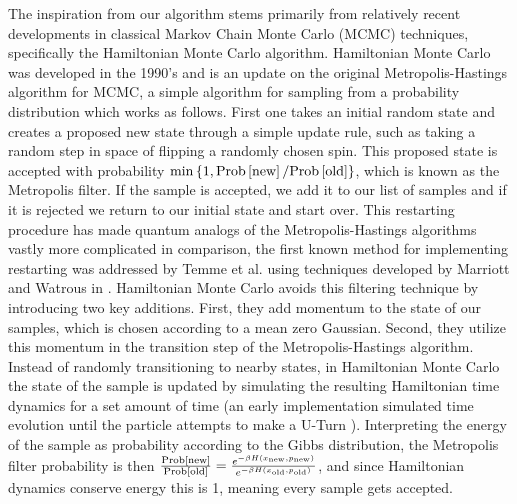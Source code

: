 \documentclass{article}
\newcommand{\set}[1]{\left\{ #1 \right\}}
\newcommand{\prob}[1]{{\rm Prob}\left[ #1 \right]}
\begin{document}
The inspiration from our algorithm stems primarily from relatively recent developments in classical Markov Chain Monte Carlo (MCMC) techniques, specifically the Hamiltonian Monte Carlo algorithm. Hamiltonian Monte Carlo was developed in the 1990's and is an update on the original Metropolis-Hastings algorithm for MCMC, a simple algorithm for sampling from a probability distribution which works as follows. First one takes an initial random state and creates a proposed new state through a simple update rule, such as taking a random step in space of flipping a randomly chosen spin. This proposed state is accepted with probability $\min \set{1, \prob{\text{new}} / \prob{\text{old}}}$, which is known as the Metropolis filter. If the sample is accepted, we add it to our list of samples and if it is rejected we return to our initial state and start over. This restarting procedure has made quantum analogs of the Metropolis-Hastings algorithms vastly more complicated in comparison, the first known method for implementing restarting was addressed by Temme et al. \cite{temme2011} using techniques developed by Marriott and Watrous in \cite{marriott2005quantum}. Hamiltonian
Monte Carlo avoids this filtering technique by introducing two key additions. First, they add momentum to the state of our samples, which is chosen according to a mean zero Gaussian. Second, they utilize this momentum in the transition step of the Metropolis-Hastings algorithm. Instead of randomly transitioning to nearby states, in Hamiltonian Monte Carlo the state of the sample is updated by simulating the resulting Hamiltonian time dynamics for a set amount of time (an early implementation simulated time evolution until the particle attempts to make a U-Turn \cite{hoffman2011nouturnsampleradaptivelysetting}). Interpreting the energy of the sample as probability according to the Gibbs distribution, the Metropolis filter probability is then $\frac{\prob{\text{new}}}{\prob{\text{old}}} = \frac{e^{-\beta H(x_{\text{new}}, p_{\text{new}}) }}{e^{-\beta H(x_{\text{old}}, p_{\text{old}}) }}$, and since Hamiltonian dynamics conserve energy this is 1, meaning every sample gets accepted.
\end{document}
